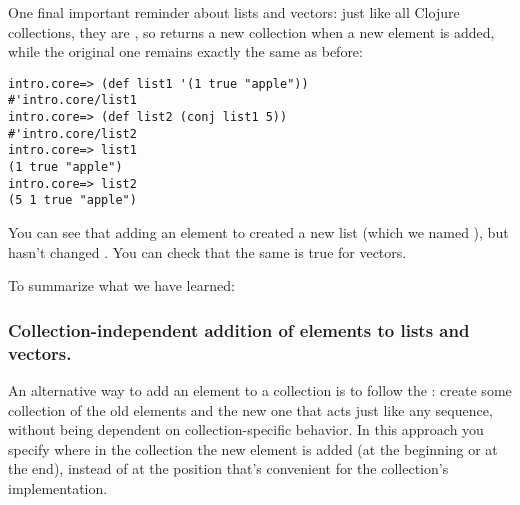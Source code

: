One final important reminder about lists and vectors:  just like all Clojure collections, they are , so  returns a new collection when a new element is added, while the original one remains exactly the same as before:
\begin{framed}
\begin{verbatim}
intro.core=> (def list1 '(1 true "apple"))
#'intro.core/list1
intro.core=> (def list2 (conj list1 5))
#'intro.core/list2
intro.core=> list1
(1 true "apple")
intro.core=> list2
(5 1 true "apple")
\end{verbatim}
\end{framed}
You can see that adding an element  to  created a new list (which we named ), but hasn't changed . You can check that the same is true for vectors. 

To summarize what we have learned: 


\subsubsection{Collection-independent addition of elements to lists and vectors. }\label{subsubsec:add-first-last}
An alternative way to add an element to a collection is to follow the : create some collection of the old elements and the new one that acts just like any sequence, without being dependent on collection-specific behavior. In this approach you specify where in the collection the new element is added (at the beginning or at the end), instead of at the position that's convenient for the collection's implementation. 


